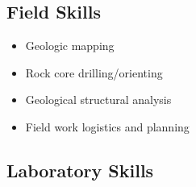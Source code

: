 \documentclass[10pt,a4paper,sans]{moderncv}
\begin{document}
\subsection{Field Skills}

\begin{itemize}
    \item Geologic mapping
    \item Rock core drilling/orienting
    \item Geological structural analysis
    \item Field work logistics and planning
\end{itemize}

\subsection{Laboratory Skills}

\end{document}
